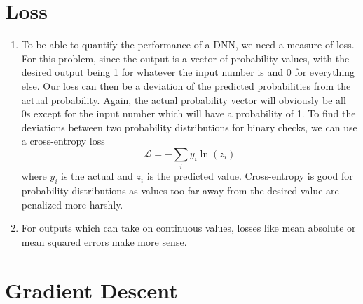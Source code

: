 \documentclass{article}
\begin{document}
\section{Loss}

\begin{enumerate}
    \item To be able to quantify the performance of a DNN, we need a measure of loss. For this problem, since the output is a vector of probability values, with the desired output being 1 for whatever the input number is and 0 for everything else. Our loss can then be a deviation of the predicted probabilities from the actual probability. Again, the actual probability vector will obviously be all 0s except for the input number which will have a probability of 1. To find the deviations between two probability distributions for binary checks, we can use a cross-entropy loss
    \[\mathcal{L} = -\sum_iy_i\ln(z_i)\]
    where $y_i$ is the actual and $z_i$ is the predicted value.
    Cross-entropy is good for probability distributions as values too far away from the desired value are penalized more harshly.
    \item For outputs which can take on continuous values, losses like mean absolute or mean squared errors make more sense.

\end{enumerate}

\section{Gradient Descent}
\end{document}
